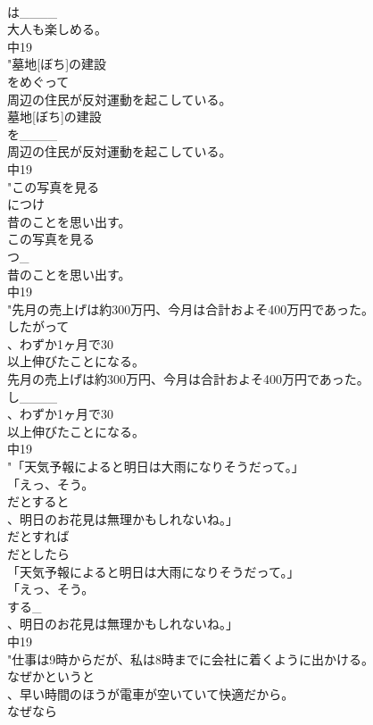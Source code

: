 \documentclass[8pt]{extreport}
\begin{document}
\begin{CJK}{UTF8}{min}
\\	は____
\\	大人も楽しめる。
\\	中19
\\	"墓地[ぼち]の建設
\\	をめぐって
\\	周辺の住民が反対運動を起こしている。
\\	墓地[ぼち]の建設
\\	を____
\\	周辺の住民が反対運動を起こしている。
\\	中19
\\	"この写真を見る
\\	につけ
\\	昔のことを思い出す。
\\	この写真を見る
\\	つ_
\\	昔のことを思い出す。
\\	中19
\\	"先月の売上げは約300万円、今月は合計およそ400万円であった。
\\	したがって
\\	、わずか1ヶ月で30
\\	以上伸びたことになる。
\\	先月の売上げは約300万円、今月は合計およそ400万円であった。
\\	し____
\\	、わずか1ヶ月で30
\\	以上伸びたことになる。
\\	中19
\\	"「天気予報によると明日は大雨になりそうだって。」
\\	「えっ、そう。
\\	だとすると
\\	、明日のお花見は無理かもしれないね。」
\\	だとすれば
\\	だとしたら
\\	「天気予報によると明日は大雨になりそうだって。」
\\	「えっ、そう。
\\	する_
\\	、明日のお花見は無理かもしれないね。」
\\	中19
\\	"仕事は9時からだが、私は8時までに会社に着くように出かける。
\\	なぜかというと
\\	、早い時間のほうが電車が空いていて快適だから。
\\	なぜなら

\end{CJK}
\end{document}
